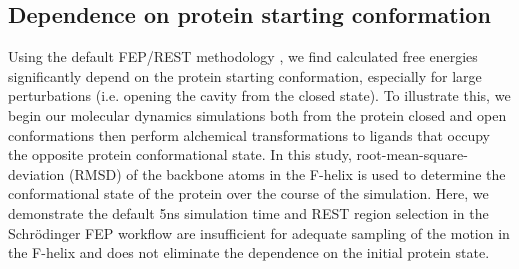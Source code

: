 \documentclass[journal=jctcce,manuscript=article]{achemso}
\begin{document}
\subsection*{Dependence on protein starting conformation}
Using the default FEP/REST methodology \cite{FEP/REST}, we find calculated free energies significantly depend on the protein starting conformation, especially for large perturbations (i.e. opening the cavity from the closed state).
To illustrate this, we begin our molecular dynamics simulations both from the protein closed and open conformations then perform alchemical transformations to ligands that occupy the opposite protein conformational state.
In this study, root-mean-square-deviation (RMSD) of the backbone atoms in the F-helix is used to determine the conformational state of the protein over the course of the simulation.
Here, we demonstrate the default 5ns simulation time and REST region selection in the Schr\"{o}dinger FEP workflow are insufficient for adequate sampling of the motion in the F-helix and does not eliminate the dependence on the initial protein state.
\end{document}
